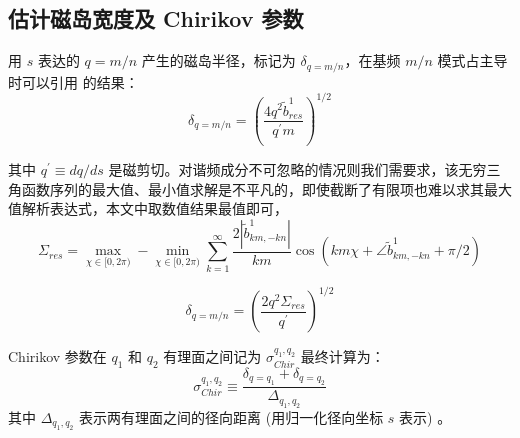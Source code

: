 
\subsection{估计磁岛宽度及 Chirikov 参数}
用 $s$ 表达的 $q=m / n$ 产生的磁岛半径，标记为 $\delta_{q=m / n}$，在基频 $m/n$ 模式占主导时可以引用 \cite{nardon_edge_2007} 的结果：
\begin{equation}
  \delta_{q=m / n}=\left(\frac{4 q^{2} \tilde{b}_{r e s}^{1}}{q^{\prime} m}\right)^{1 / 2}
\end{equation}

其中 $q^{\prime} \equiv d q / d s$ 是磁剪切。对谐频成分不可忽略的情况则我们需要求，该无穷三角函数序列的最大值、最小值求解是不平凡的，即使截断了有限项也难以求其最大值解析表达式，本文中取数值结果最值即可，
\begin{equation}
  \Sigma_{res} = \max_{\chi\in [0,2\pi)} - \min_{\chi\in [0,2\pi)}\sum_{k=1}^{\infty} \frac{2\left|\tilde{b}_{km,-kn}^{1}\right|}{km}   \cos \left(km\chi + \angle\tilde{b}_{km,-kn}^{1} + \pi/2 \right)
\end{equation}


\begin{equation}
  \delta_{q=m / n}=\left(\frac{2 q^{2} \Sigma_{res}}{q^{\prime} }\right)^{1 / 2}
\end{equation}

Chirikov 参数在 $q_1$ 和 $q_2$ 有理面之间记为 $\sigma_{C h i r}^{q_1, q_2}$ 最终计算为：
\[
\sigma_{C h i r}^{q_1, q_2} \equiv \frac{\delta_{q=q_1}+\delta_{q=q_2}}{\Delta_{q_1, q_2}}
\]
其中 $\Delta_{q_1, q_2}$ 表示两有理面之间的径向距离 (用归一化径向坐标 $s$ 表示) 。



